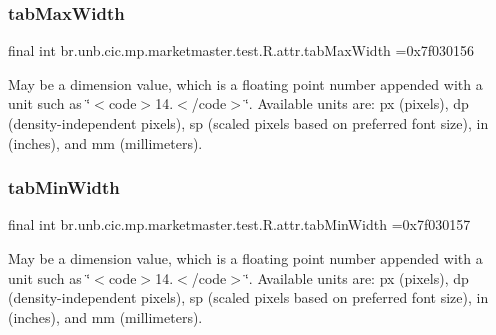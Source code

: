\subsubsection{\texorpdfstring{tab\+Max\+Width}{tabMaxWidth}}
{\footnotesize\ttfamily final int br.\+unb.\+cic.\+mp.\+marketmaster.\+test.\+R.\+attr.\+tab\+Max\+Width =0x7f030156\hspace{0.3cm}{\ttfamily [static]}}

May be a dimension value, which is a floating point number appended with a unit such as \char`\"{}$<$code$>$14.\+5sp$<$/code$>$\char`\"{}. Available units are\+: px (pixels), dp (density-\/independent pixels), sp (scaled pixels based on preferred font size), in (inches), and mm (millimeters). \mbox{\label{classbr_1_1unb_1_1cic_1_1mp_1_1marketmaster_1_1test_1_1R_1_1attr_a5c2088c2460327052b0c84866e6f29ab}} 
\subsubsection{\texorpdfstring{tab\+Min\+Width}{tabMinWidth}}
{\footnotesize\ttfamily final int br.\+unb.\+cic.\+mp.\+marketmaster.\+test.\+R.\+attr.\+tab\+Min\+Width =0x7f030157\hspace{0.3cm}{\ttfamily [static]}}

May be a dimension value, which is a floating point number appended with a unit such as \char`\"{}$<$code$>$14.\+5sp$<$/code$>$\char`\"{}. Available units are\+: px (pixels), dp (density-\/independent pixels), sp (scaled pixels based on preferred font size), in (inches), and mm (millimeters). \mbox{\label{classbr_1_1unb_1_1cic_1_1mp_1_1marketmaster_1_1test_1_1R_1_1attr_a2b7ba65d728c31c286bb0921e9a2aa1e}} 
